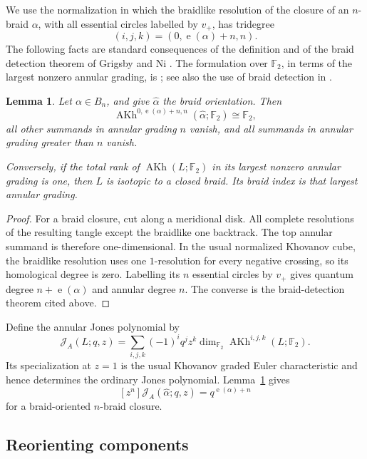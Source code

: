 \documentclass[11pt]{amsart}
\newtheorem{lemma}[theorem]{Lemma}
\theoremstyle{remark}
\newcommand{\F}{\mathbb F_2}
\newcommand{\AKh}{\operatorname{AKh}}
\newcommand{\e}{\operatorname{e}}
\begin{document}
We use the normalization in which the braidlike resolution of the closure of an
\(n\)-braid \(\alpha\), with all essential circles labelled by \(v_+\), has tridegree
\[
  (i,j,k)=(0,\e(\alpha)+n,n).
\]
The following facts are standard consequences of the definition and of the braid
detection theorem of Grigsby and Ni \cite[Corollary~1.2]{GrigsbyNi}.  The
formulation over \(\mathbb F_2\), in terms of the largest nonzero annular grading, is
\cite[Proposition~2.2.8]{Kim}; see also the use of braid detection in
\cite[proof of Theorem~3.11]{Binns}.

\begin{lemma}\label{lem:extremal}
Let \(\alpha\in B_n\), and give \(\widehat\alpha\) the braid orientation.  Then
\[
  \AKh^{0,\e(\alpha)+n,n}(\widehat\alpha;\F)\cong\F,
\]
all other summands in annular grading \(n\) vanish, and all summands in annular
grading greater than \(n\) vanish.

Conversely, if the total rank of \(\AKh(L;\F)\) in its largest nonzero annular
grading is one, then \(L\) is isotopic to a closed braid.  Its braid index is that
largest annular grading.
\end{lemma}

\begin{proof}
For a braid closure, cut along a meridional disk.  All complete resolutions of the
resulting tangle except the braidlike one backtrack.  The top annular summand is
therefore one-dimensional.  In the usual normalized Khovanov cube, the braidlike
resolution uses one \(1\)-resolution for every negative crossing, so its homological
degree is zero.  Labelling its \(n\) essential circles by \(v_+\) gives quantum degree
\(n+\e(\alpha)\) and annular degree \(n\).  The converse is the braid-detection
theorem cited above.
\end{proof}

Define the annular Jones polynomial by
\[
  \mathcal J_A(L;q,z)
  =\sum_{i,j,k}(-1)^i q^jz^k
       \dim_{\F}\AKh^{i,j,k}(L;\F).
\]
Its specialization at \(z=1\) is the usual Khovanov graded Euler characteristic and
hence determines the ordinary Jones polynomial.  Lemma~\ref{lem:extremal} gives
\begin{equation}\label{eq:top-annular-term}
  [z^n]\mathcal J_A(\widehat\alpha;q,z)=q^{\e(\alpha)+n}
\end{equation}
for a braid-oriented \(n\)-braid closure.

\subsection{Reorienting components}
\end{document}
